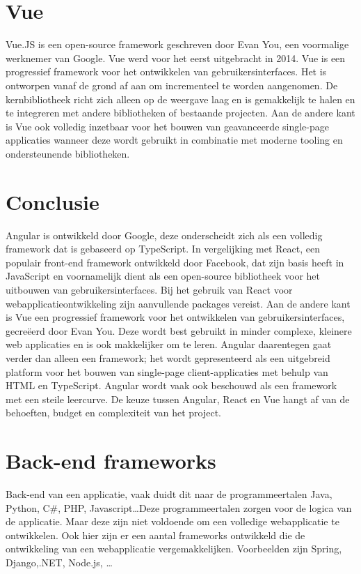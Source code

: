 \section*{Vue}%
Vue.JS is een open-source framework geschreven door Evan You, een voormalige
werknemer van Google. Vue werd voor het eerst uitgebracht in 2014. Vue is een
progressief framework voor het ontwikkelen van gebruikersinterfaces. Het is
ontworpen vanaf de grond af aan om incrementeel te worden aangenomen. De
kernbibliotheek richt zich alleen op de weergave laag en is gemakkelijk te
halen en te integreren met andere bibliotheken of bestaande projecten. Aan de
andere kant is Vue ook volledig inzetbaar voor het bouwen van geavanceerde
single-page applicaties wanneer deze wordt gebruikt in combinatie met moderne
tooling en ondersteunende bibliotheken.\autocite{VueGithub2024}

\section*{Conclusie}
Angular is ontwikkeld door Google, deze onderscheidt zich als een volledig
framework dat is gebaseerd op TypeScript. In vergelijking met React, een
populair front-end framework ontwikkeld door Facebook, dat zijn basis heeft in
JavaScript en voornamelijk dient als een open-source bibliotheek voor het
uitbouwen van gebruikersinterfaces. Bij het gebruik van React voor
webapplicatieontwikkeling zijn aanvullende packages vereist. Aan de andere kant
is Vue een progressief framework voor het ontwikkelen van gebruikersinterfaces,
gecreëerd door Evan You.\cite{EvanYou2024} Deze wordt best gebruikt in
minder complexe, kleinere web applicaties en is ook makkelijker om te leren.
Angular daarentegen gaat verder dan alleen een framework; het wordt
gepresenteerd als een uitgebreid platform voor het bouwen van single-page
client-applicaties met behulp van HTML en TypeScript. Angular wordt vaak ook
beschouwd als een framework met een steile leercurve. De keuze tussen Angular,
React en Vue hangt af van de behoeften, budget en complexiteit van het
project.\autocite{Joshi2023}
\section*{Back-end frameworks}%
Back-end van een applicatie, vaak duidt dit naar de programmeertalen Java,
Python, C\#, PHP, Ja\-va\-script\ldots Deze programmeertalen zorgen voor de
logica van de applicatie. Maar deze zijn niet voldoende om een volledige
webapplicatie te ontwikkelen. Ook hier zijn er een aantal frameworks ontwikkeld
die de ontwikkeling van een webapplicatie vergemakkelijken. Voorbeelden zijn
Spring, Django,.NET, Node.js, \ldots\autocite{Kaluza2019}


